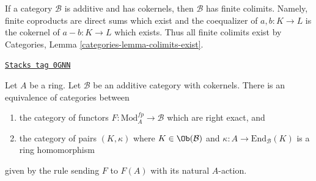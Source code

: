 If a category $\mathcal{B}$ is additive and has cokernels,
then $\mathcal{B}$ has finite colimits. Namely, finite coproducts
are direct sums which exist and the coequalizer of $a, b : K \to L$
is the cokernel of $a - b : K \to L$ which exists. Thus all finite
colimits exist by Categories, Lemma \ref{categories-lemma-colimits-exist}.

\begin{lemma}
\label{functors-lemma-functor-on-modules-fp}
\href{https://stacks.math.columbia.edu/tag/0GNN}{\texttt{Stacks tag 0GNN}}

Let $A$ be a ring. Let $\mathcal{B}$ be an additive category
with cokernels. There is an equivalence of categories between
\begin{enumerate}
\item the category of functors $F : \text{Mod}^{fp}_A \to \mathcal{B}$
which are right exact, and
\item the category of pairs $(K, \kappa)$ where $K \in \Ob(\mathcal{B})$
and $\kappa : A \to \text{End}_\mathcal{B}(K)$ is a ring homomorphism
\end{enumerate}
given by the rule sending $F$ to $F(A)$ with its natural $A$-action.
\end{lemma}

